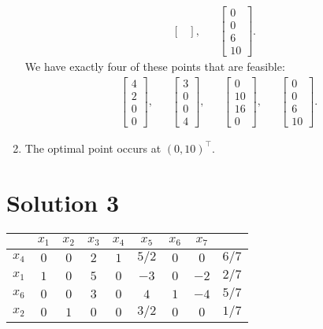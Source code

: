 \documentclass[a4paper, 12pt]{article}
\numberwithin{equation}{section}
\numberwithin{figure}{section}
\theoremstyle{definition}
\begin{document}
\begin{enumerate}[label=$(\roman* )$]
\begin{align*}
\begin{bmatrix}
        \end{bmatrix}, & & \begin{bmatrix}
            0 \\ 0 \\ 6 \\ 10
        \end{bmatrix}.
    \end{align*}
    We have exactly four of these points that are feasible:
    \begin{align*}
        & \begin{bmatrix}
            4 \\ 2 \\ 0 \\ 0
        \end{bmatrix}, & & \begin{bmatrix}
            3 \\ 0 \\ 0 \\ 4
        \end{bmatrix}, & & \begin{bmatrix}
            0 \\ 10 \\ 16 \\ 0
        \end{bmatrix}, & & \begin{bmatrix}
            0 \\ 0 \\ 6 \\ 10
        \end{bmatrix}.
    \end{align*}
    \item The optimal point occurs at $(0,10)^{\top}$.
\end{enumerate}

\section*{Solution 3}

\begin{center}
    \begin{tabular}{|c|ccccccc|c|}
        \hline
        & $x_1$ & $x_2$ & $x_3$ & $x_4$ & $x_5$ & $x_6$ & $x_7$ & \\ \hline
        $x_4$ & $0$ & $0$ & $2$ & $1$ & $5/2$ & $0$ & $0$ & $6/7$ \\ 
        $x_1$ & $1$ & $0$ & $5$ & $0$ & $-3$ & $0$ & $-2$ & $2/7$ \\ 
        $x_6$ & $0$ & $0$ & $3$ & $0$ & $4$ & $1$ & $-4$ & $5/7$ \\ 
        $x_2$ & $0$ & $1$ & $0$ & $0$ & $3/2$ & $0$ & $0$ & $1/7$ \\ \hline
    \end{tabular}
\end{center}
\end{document}
